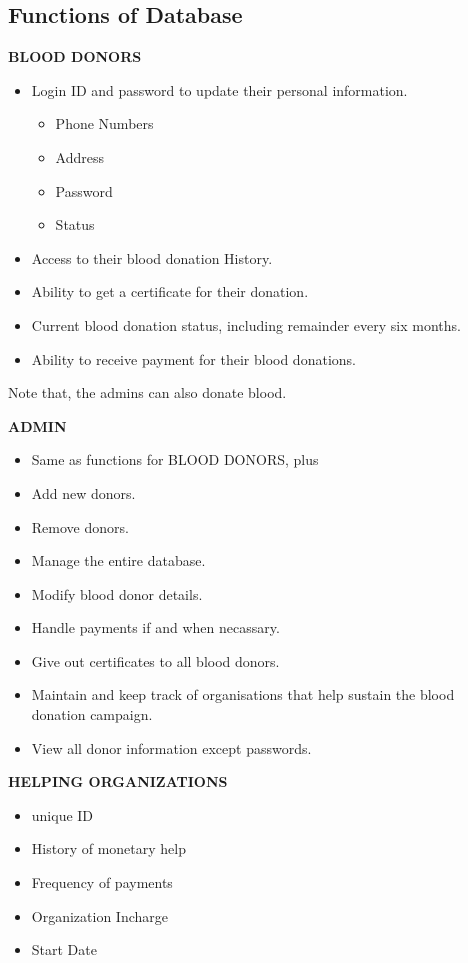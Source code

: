 \subsection{Functions of Database}
\break
\textbf{BLOOD DONORS}
\begin{itemize}
  \item Login ID and password to update their personal information.
  \begin{itemize}
    \item Phone Numbers
    \item Address
    \item Password
    \item Status
  \end{itemize}
  \item Access to their blood donation History.
  \item Ability to get a certificate for their donation.
  \item Current blood donation status, including remainder every six months.
  \item Ability to receive payment for their blood donations.
\end{itemize}

Note that, the admins can also donate blood.

\textbf{ADMIN}
\begin{itemize}
  \item Same as functions for BLOOD DONORS, plus
  \item Add new donors.
  \item Remove donors.
  \item Manage the entire database.
  \item Modify blood donor details.
  \item Handle payments if and when necassary.
  \item Give out certificates to all blood donors.
  \item Maintain and keep track of organisations that help sustain the blood donation campaign.
  \item View all donor information except passwords.
\end{itemize}

\textbf{HELPING ORGANIZATIONS}
\begin{itemize}
  \item unique ID
  \item History of monetary help
  \item Frequency of payments
  \item Organization Incharge
  \item Start Date
\end{itemize}

